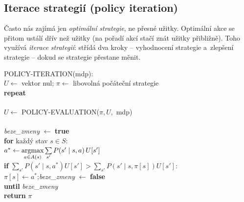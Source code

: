 \subsection{Iterace strategií (policy iteration)}

Často nás zajímá jen \emph{optimální strategie}, ne přesné užitky. Optimální akce se přitom ustálí dřív než užitky (na pořadí akcí stačí znát užitky přibližně). Toho využívá \emph{iterace strategií}: střídá dva kroky -- vyhodnocení strategie a~zlepšení strategie -- dokud se strategie přestane měnit.

\begin{algo}
\ttfamily\small
POLICY-ITERATION(mdp):\\
\hspace*{1.5em}$U \leftarrow$ vektor nul; $\pi \leftarrow$ libovolná počáteční strategie\\
\hspace*{1.5em}\textbf{repeat}\\
\hspace*{3em}\\
\hspace*{3em}$U \leftarrow$ POLICY-EVALUATION($\pi, U,$ mdp)\\
\hspace*{3em}\\
\hspace*{3em}\textit{beze\_zmeny} $\leftarrow$ \textbf{true}\\
\hspace*{3em}\textbf{for} každý stav $s \in S$:\\
\hspace*{4.5em}$a^\ast \leftarrow \operatorname*{argmax}\limits_{a\in A(s)} \sum\limits_{s'} P(s'\mid s,a)\,U[s']$\\
\hspace*{4.5em}\textbf{if} $\sum_{s'} P(s'\mid s,a^\ast)U[s'] > \sum_{s'} P(s'\mid s,\pi[s])U[s']$:\\
\hspace*{6em}$\pi[s] \leftarrow a^\ast$;\quad \textit{beze\_zmeny} $\leftarrow$ \textbf{false}\\
\hspace*{1.5em}\textbf{until} \textit{beze\_zmeny}\\
\hspace*{1.5em}\textbf{return} $\pi$
\end{algo}

